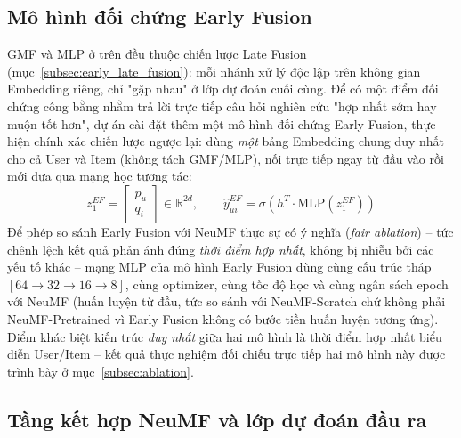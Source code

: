 \subsection{Mô hình đối chứng Early Fusion}
\label{subsec:early_fusion_design}

GMF và MLP ở trên đều thuộc chiến lược Late Fusion (mục~\ref{subsec:early_late_fusion}): mỗi nhánh xử lý độc lập trên không gian Embedding riêng, chỉ "gặp nhau" ở lớp dự đoán cuối cùng. Để có một điểm đối chứng công bằng nhằm trả lời trực tiếp câu hỏi nghiên cứu "hợp nhất sớm hay muộn tốt hơn", dự án cài đặt thêm một mô hình đối chứng Early Fusion, thực hiện chính xác chiến lược ngược lại: dùng \emph{một} bảng Embedding chung duy nhất cho cả User và Item (không tách GMF/MLP), nối trực tiếp ngay từ đầu vào rồi mới đưa qua mạng học tương tác:
\begin{equation}
    z_1^{EF} = \begin{bmatrix} p_u \\ q_i \end{bmatrix} \in \mathbb{R}^{2d}, \qquad
    \hat{y}_{ui}^{EF} = \sigma\left(h^T \cdot \text{MLP}(z_1^{EF})\right)
    \label{eq:early_fusion_design}
\end{equation}
Để phép so sánh Early Fusion với NeuMF thực sự có ý nghĩa (\textit{fair ablation}) -- tức chênh lệch kết quả phản ánh đúng \emph{thời điểm hợp nhất}, không bị nhiễu bởi các yếu tố khác -- mạng MLP của mô hình Early Fusion dùng cùng cấu trúc tháp $[64 \to 32 \to 16 \to 8]$, cùng optimizer, cùng tốc độ học và cùng ngân sách epoch với NeuMF (huấn luyện từ đầu, tức so sánh với NeuMF-Scratch chứ không phải NeuMF-Pretrained vì Early Fusion không có bước tiền huấn luyện tương ứng). Điểm khác biệt kiến trúc \emph{duy nhất} giữa hai mô hình là thời điểm hợp nhất biểu diễn User/Item -- kết quả thực nghiệm đối chiếu trực tiếp hai mô hình này được trình bày ở mục~\ref{subsec:ablation}.

\subsection{Tầng kết hợp NeuMF và lớp dự đoán đầu ra}
\label{subsec:neumf_output}

